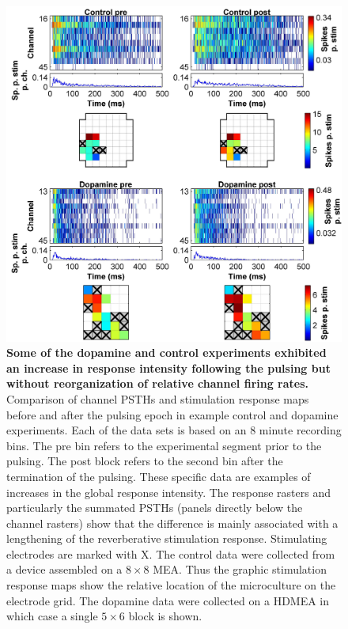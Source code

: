   \begin{figure}[!htb]
       \centering
       \includegraphics[width=15cm]{chapter6/figures/pulsingChannelsExample/pulsesChannelExampleIncrease.jpg}

       \caption[Channel PSTHs before and after administration of pulsing protocol with dopamine or control solutions - example of global increase in response intensity]{\textbf{Some of the dopamine and control experiments exhibited an increase in response intensity following the pulsing but without reorganization of relative channel firing rates.} Comparison of channel PSTHs and stimulation response maps before and after the pulsing epoch in example control and dopamine experiments. Each of the data sets is based on an 8 minute recording bins. The pre bin refers to the experimental segment prior to the pulsing. The post block refers to the second bin after the termination of the pulsing. These specific data are examples of increases in the global response intensity. The response rasters and particularly the summated PSTHs (panels directly below the channel rasters) show that the difference is mainly associated with a lengthening of the reverberative stimulation response. Stimulating electrodes are marked with X. The control data were collected from a device assembled on a \(8\times8\) MEA. Thus the graphic stimulation response maps show the relative location of the microculture on the electrode grid. The dopamine data were collected on a HDMEA in which case a single \(5\times6\) block is shown.}

       \label{fig:pulses:pulsingChannelsExampleIncrease}
  \end{figure}

